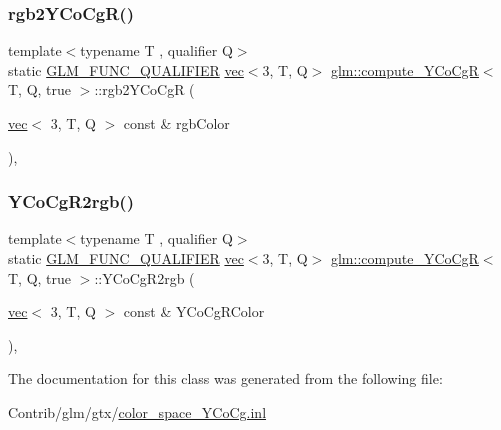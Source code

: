 \subsubsection{\texorpdfstring{rgb2\+Y\+Co\+Cg\+R()}{rgb2YCoCgR()}}
{\footnotesize\ttfamily template$<$typename T , qualifier Q$>$ \\
static \mbox{\hyperlink{setup_8hpp_a33fdea6f91c5f834105f7415e2a64407}{G\+L\+M\+\_\+\+F\+U\+N\+C\+\_\+\+Q\+U\+A\+L\+I\+F\+I\+ER}} \mbox{\hyperlink{structglm_1_1vec}{vec}}$<$3, T, Q$>$ \mbox{\hyperlink{classglm_1_1compute___y_co_cg_r}{glm\+::compute\+\_\+\+Y\+Co\+CgR}}$<$ T, Q, true $>$\+::rgb2\+Y\+Co\+CgR (\begin{DoxyParamCaption}\item[{\mbox{\hyperlink{structglm_1_1vec}{vec}}$<$ 3, T, Q $>$ const \&}]{rgb\+Color }\end{DoxyParamCaption})\hspace{0.3cm}{\ttfamily [inline]}, {\ttfamily [static]}}

\mbox{\label{classglm_1_1compute___y_co_cg_r_3_01_t_00_01_q_00_01true_01_4_aa5c06979ab1f4762a3d4528d55e9655d}} 
\subsubsection{\texorpdfstring{Y\+Co\+Cg\+R2rgb()}{YCoCgR2rgb()}}
{\footnotesize\ttfamily template$<$typename T , qualifier Q$>$ \\
static \mbox{\hyperlink{setup_8hpp_a33fdea6f91c5f834105f7415e2a64407}{G\+L\+M\+\_\+\+F\+U\+N\+C\+\_\+\+Q\+U\+A\+L\+I\+F\+I\+ER}} \mbox{\hyperlink{structglm_1_1vec}{vec}}$<$3, T, Q$>$ \mbox{\hyperlink{classglm_1_1compute___y_co_cg_r}{glm\+::compute\+\_\+\+Y\+Co\+CgR}}$<$ T, Q, true $>$\+::Y\+Co\+Cg\+R2rgb (\begin{DoxyParamCaption}\item[{\mbox{\hyperlink{structglm_1_1vec}{vec}}$<$ 3, T, Q $>$ const \&}]{Y\+Co\+Cg\+R\+Color }\end{DoxyParamCaption})\hspace{0.3cm}{\ttfamily [inline]}, {\ttfamily [static]}}



The documentation for this class was generated from the following file\+:\begin{DoxyCompactItemize}
\item 
Contrib/glm/gtx/\mbox{\hyperlink{color__space___y_co_cg_8inl}{color\+\_\+space\+\_\+\+Y\+Co\+Cg.\+inl}}\end{DoxyCompactItemize}
